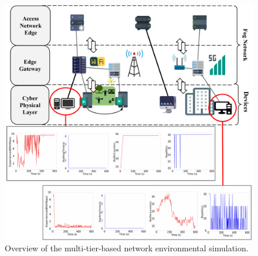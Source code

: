 \begin{figure}
    \centering
    \includegraphics[width=0.9\linewidth]{images/qoe-multi-level.pdf}
    \caption{Overview of the multi-tier-based  network environmental simulation.}
    \label{fig:impact-two-layers}
\end{figure}
